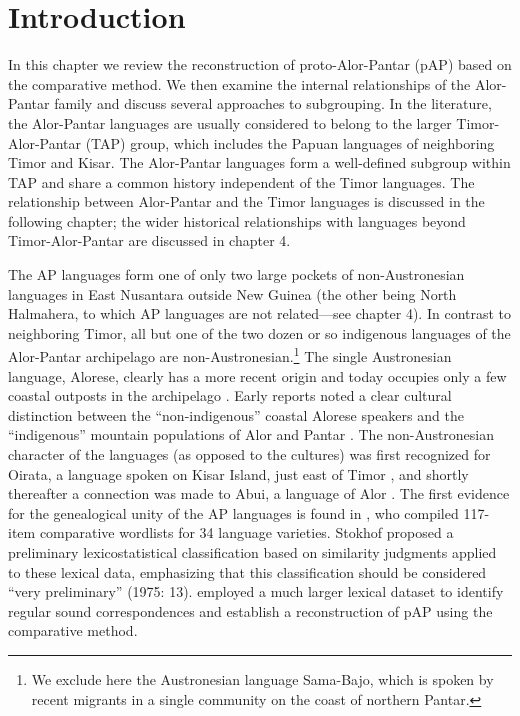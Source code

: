 
\section{Introduction}
\hypertarget{Toc376957608}{}
In this chapter we review the reconstruction of proto-Alor-Pantar (pAP) based on the comparative method. We then examine the internal relationships of the Alor-Pantar family and discuss several approaches to subgrouping. In the literature, the Alor-Pantar languages are usually considered to belong to the larger Timor-Alor-Pantar (TAP) group, which includes the Papuan languages of neighboring Timor and Kisar. The Alor-Pantar languages form a well-defined subgroup within TAP and share a common history independent of the Timor languages. The relationship between Alor-Pantar and the Timor languages is discussed in the following chapter; the wider historical relationships with languages beyond Timor-Alor-Pantar are discussed in chapter 4. 

The AP languages form one of only two large pockets of non-Austronesian languages in East Nusantara outside New Guinea (the other being North Halmahera, to which AP languages are not related---see chapter 4). In contrast to neighboring Timor, all but one of the two dozen or so indigenous languages of the Alor-Pantar archipelago are non-Austronesian.\footnote{ We exclude here the Austronesian language Sama-Bajo, which is spoken by recent migrants in a single community on the coast of northern Pantar.} The single Austronesian language, Alorese, clearly has a more recent origin and today occupies only a few coastal outposts in the archipelago \citep{Klamer2011,Klamer2012}. Early reports noted a clear cultural distinction between the ``non-indigenous'' coastal Alorese speakers and the ``indigenous'' mountain populations of Alor and Pantar \citep[75-8]{Anonymous1914}. The non-Austronesian character of the languages (as opposed to the cultures) was first recognized for Oirata, a 
language spoken on Kisar Island, just east of Timor \citet{DeJong1937}, and shortly thereafter a connection was made to Abui, a language of Alor \citep{Nicolspeyer1940}. The first evidence for the genealogical unity of the AP languages is found in \citet{Stokhof1975}, who compiled 117-item comparative wordlists for 34 language varieties. Stokhof proposed a preliminary lexicostatistical classification based on similarity judgments applied to these lexical data, emphasizing that this classification should be considered ``very preliminary'' (1975: 13). \citet{HoltonEtAl2012} employed a much larger lexical dataset to identify regular sound correspondences and establish a reconstruction of pAP using the comparative method. 

